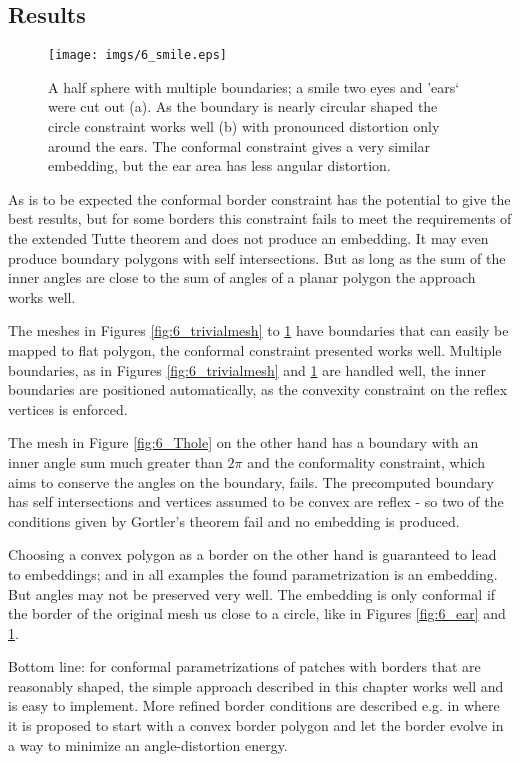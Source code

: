 \subsection{Results}


\begin{figure}%
\texttt{[image: imgs/6\_smile.eps]}%
\caption{A half sphere with multiple boundaries; a smile two eyes and 'ears` were cut out (a). As the boundary is nearly circular shaped the circle constraint works well (b) with pronounced distortion only around the ears. The conformal constraint gives a very similar embedding, but the ear area has less angular distortion.}
\label{fig:6_smile}
\end{figure}

As is to be expected the conformal border constraint has the potential to give the best results, but for some borders this constraint fails to meet the requirements of the extended Tutte theorem and does not produce an embedding. It may even produce boundary polygons with self intersections. But as long as the sum of the inner angles are close to the sum of angles of a planar polygon the approach works well. 

The meshes in Figures \ref{fig:6_trivialmesh} to \ref{fig:6_smile} have boundaries that can easily be mapped to flat polygon, the conformal constraint presented works well. Multiple boundaries, as in Figures \ref{fig:6_trivialmesh} and \ref{fig:6_smile} are handled well, the inner boundaries are positioned automatically, as the convexity constraint on the reflex vertices is enforced.

The mesh in Figure \ref{fig:6_Thole} on the other hand has a boundary with an inner angle sum much greater than $2\pi$ and the conformality constraint, which aims to conserve the angles on the boundary, fails. The precomputed boundary has self intersections and vertices assumed to be convex are reflex - so two of the conditions given by Gortler's theorem fail and no embedding is produced.

Choosing a convex polygon as a border on the other hand is guaranteed to lead to embeddings; and in all examples the found parametrization is an embedding. But angles may not be preserved very well. The embedding is only conformal if the border of the original mesh us close to a circle, like in Figures \ref{fig:6_ear} and \ref{fig:6_smile}.

Bottom line: for conformal parametrizations of patches with borders that are reasonably shaped, the simple approach described in this chapter works well and is easy to implement. More refined border conditions are described e.g. in \cite{meshpar1} where it is proposed to start with a convex border polygon and let the border evolve in a way to minimize an angle-distortion energy. 

